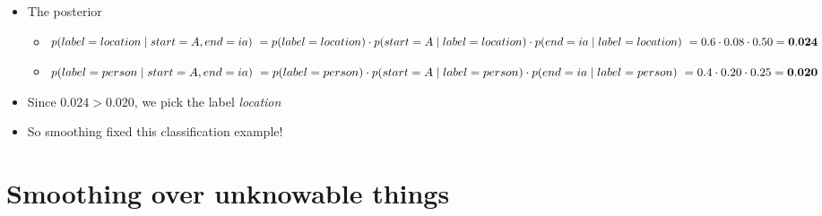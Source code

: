 \documentclass[11pt,letterpaper]{article}
\begin{document}
\begin{itemize}
\begin{itemize}
    \end{itemize}


  \item The posterior
    \begin{itemize}
      \item $p(label=location \mid start=A, end=ia) \\
            ~ = p(label=location) \cdot p(start=A \mid label=location) \cdot p(end=ia \mid label=location) \\
            ~ = 0.6 \cdot 0.08 \cdot 0.50 = \mathbf{0.024}$
      \item $p(label=person \mid start=A, end=ia) \\
            ~ = p(label=person) \cdot p(start=A \mid label=person) \cdot p(end=ia \mid label=person) \\
            ~ = 0.4 \cdot 0.20 \cdot 0.25 = \mathbf{0.020}$
    \end{itemize}
  \item Since $0.024 > 0.020$, we pick the label \textit{location}
  \item So smoothing fixed this classification example!
\end{itemize}




\section{Smoothing over unknowable things}
\end{document}
